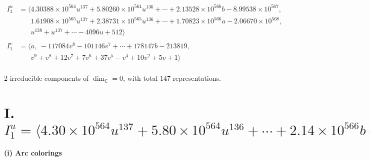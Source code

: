 \documentclass[1p]{elsarticle_modified}
\theoremstyle{definition}
\begin{document}
\begin{align*}
I^u_{1}&=\langle 
4.30388\times10^{564} u^{137}+5.80260\times10^{564} u^{136}+\cdots+2.13528\times10^{566} b-8.99538\times10^{567},\\
\phantom{I^u_{1}}&\phantom{= \langle  }1.61908\times10^{565} u^{137}+2.38731\times10^{565} u^{136}+\cdots+1.70823\times10^{566} a-2.06670\times10^{568},\\
\phantom{I^u_{1}}&\phantom{= \langle  }u^{138}+u^{137}+\cdots-4096 u+512\rangle \\
\\
I^v_{1}&=\langle 
a,\;-117084 v^8-101146 v^7+\cdots+178147 b-213819,\\
\phantom{I^v_{1}}&\phantom{= \langle  }v^9+v^8+12 v^7+7 v^6+37 v^5- v^4+10 v^2+5 v+1\rangle \\
\end{align*}
\raggedright * 2 irreducible components of $\dim_{\mathbb{C}}=0$, with total 147 representations.\\
\newpage
\renewcommand{\arraystretch}{1}
\centering \section*{I. $I^u_{1}= \langle 4.30\times10^{564} u^{137}+5.80\times10^{564} u^{136}+\cdots+2.14\times10^{566} b-9.00\times10^{567},\;1.62\times10^{565} u^{137}+2.39\times10^{565} u^{136}+\cdots+1.71\times10^{566} a-2.07\times10^{568},\;u^{138}+u^{137}+\cdots-4096 u+512 \rangle$}
\flushleft \textbf{(i) Arc colorings}\\
\end{document}
